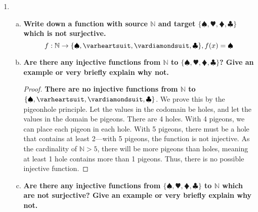 \documentclass[article, 12pt]{article}
\theoremstyle{definition}
\DeclarePairedDelimiter\set{\{}{\}}
\newcommand{\nats}{\mathbb{N}}
\newcommand{\clubs}{\clubsuit}
\newcommand{\diamonds}{\vardiamondsuit}
\newcommand{\hearts}{\varheartsuit}
\newcommand{\spades}{\spadesuit}
\begin{document}
\begin{enumerate}[(1)]
\begin{proof}
            \[ f: \nats \to \nats, f(x) = \begin{cases} 1 & x = 1 \\ x-1 & x \neq 1 \end{cases} \]
            The union of the domains of the two pieces is the domain of the function, $\nats$. The intersection of the domains of the two pieces is the empty set, so the function is injective.
        \end{proof}
        \begin{proof}
            \textbf{The function is surjective}. The definition of surjective for a function $f$ with domain $A$ is
            \[ \forall y \exists x (x \in A \land f(x) = y) \]
            When $x \neq 1$, $f(x) = x - 1$. For all values $y$ in the codomain, there is a value $x$ in the domain, $y+1$, that maps to it. When $x=1$, $y=1$. Despite the image 1 having 2 preimages, 1, and 2, the definition of surjective is still satisfied.
        \end{proof}
        \item \begin{enumerate}[(a)]
            \item \textbf{Write down a function with source $\nats$ and target $\{\spades, \hearts, \diamonds, \clubs\}$ which is not surjective.}
            \[ f: \nats \to \set*{\spades, \hearts, \diamonds, \clubs}, f(x) = \spades \]
            \item \textbf{Are there any injective functions from $\nats$ to $\{\spades, \hearts, \diamonds, \clubs\}$? Give an example or very briefly explain why not.}
            \begin{proof}
                \textbf{There are no injective functions from $\nats$ to $\set*{\spades, \hearts, \diamonds, \clubs}$}. We prove this by the pigeonhole principle. Let the values in the codomain be holes, and let the values in the domain be pigeons. There are 4 holes. With 4 pigeons, we can place each pigeon in each hole. With 5 pigeons, there must be a hole that contains at least 2---with 5 pigeons, the function is not injective. As the cardinality of $\nats > 5$, there will be more pigeons than holes, meaning at least 1 hole contains more than 1 pigeons. Thus, there is no possible injective function.
            \end{proof}
            \item \textbf{Are there any injective functions from $\{\spades, \hearts, \diamonds, \clubs\}$ to $\nats$ which are not surjective? Give an example or very briefly explain why not.}
            \end{enumerate}
    \end{enumerate}
\end{document}
